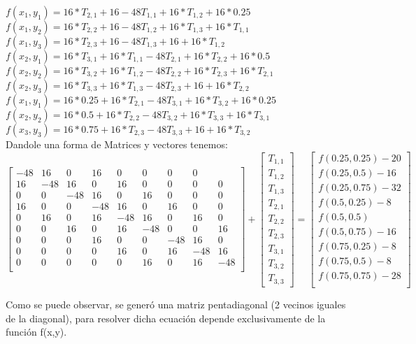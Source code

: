 $f(x_1,y_1) = 16*T_{2,1} + 16 - 48 T_{1,1} + 16*T_{1,2} + 16*0.25$\\
$f(x_1,y_2) = 16*T_{2,2} + 16 - 48 T_{1,2} + 16*T_{1,3} + 16*T_{1,1}$\\
$f(x_1,y_3) = 16*T_{2,3} + 16 - 48 T_{1,3} + 16 + 16*T_{1,2}$\\
$f(x_2,y_1) = 16*T_{3,1} + 16*T_{1,1} - 48 T_{2,1} + 16*T_{2,2} + 16*0.5$\\
$f(x_2,y_2) = 16*T_{3,2} + 16*T_{1,2} - 48 T_{2,2} + 16*T_{2,3} + 16*T_{2,1}$\\
$f(x_2,y_3) = 16*T_{3,3} + 16*T_{1,3} - 48 T_{2,3} + 16 + 16*T_{2,2}$\\
$f(x_1,y_1) = 16*0.25 + 16*T_{2,1} - 48 T_{3,1} + 16*T_{3,2} + 16*0.25$\\
$f(x_2,y_2) = 16*0.5 + 16*T_{2,2} - 48 T_{3,2} + 16*T_{3,3} + 16*T_{3,1}$\\
$f(x_3,y_3) = 16*0.75 + 16*T_{2,3} - 48 T_{3,3} + 16 + 16*T_{3,2}$\\

Dandole una forma de Matrices y vectores tenemos:
\[
\begin{bmatrix}
    -48 & 16 & 0 & 16 & 0 & 0 & 0 & 0\\
    16 & -48 & 16 & 0 & 16 & 0 & 0 & 0 & 0 \\
    0 &  0 & -48 & 16 & 0 & 16 & 0 & 0 & 0 \\
    16 & 0 & 0 & -48 & 16 & 0 & 16 & 0 & 0 \\
    0 & 16 & 0 & 16 & -48 & 16 & 0 & 16 & 0 \\
    0 & 0 & 16 & 0 & 16 & -48 & 0 & 0 & 16  \\
    0 & 0 & 0& 16 & 0 & 0 & -48 & 16 & 0\\
    0 & 0 & 0 & 0 & 16 & 0 & 16 & -48 & 16 \\
    0 & 0 & 0 & 0 & 0 & 16 & 0 & 16 & -48 \\
\end{bmatrix}
+
\begin{bmatrix}
    T_{1,1} \\
    T_{1,2} \\
    T_{1,3} \\
    T_{2,1} \\
    T_{2,2} \\
    T_{2,3} \\
    T_{3,1} \\
    T_{3,2} \\
    T_{3,3} 
\end{bmatrix}
=
\begin{bmatrix}
    f(0.25, 0.25) - 20 \\
    f(0.25, 0.5) - 16\\
    f(0.25, 0.75) - 32\\
    f(0.5, 0.25) - 8\\
    f(0.5, 0.5) \\
    f(0.5, 0.75) - 16\\
    f(0.75, 0.25) -8 \\
    f(0.75, 0.5) - 8 \\
    f(0.75, 0.75) - 28 \\
\end{bmatrix}
\]

Como se puede observar, se generó una matriz pentadiagonal (2 vecinos iguales de la diagonal), para resolver dicha ecuación depende exclusivamente de la función f(x,y).